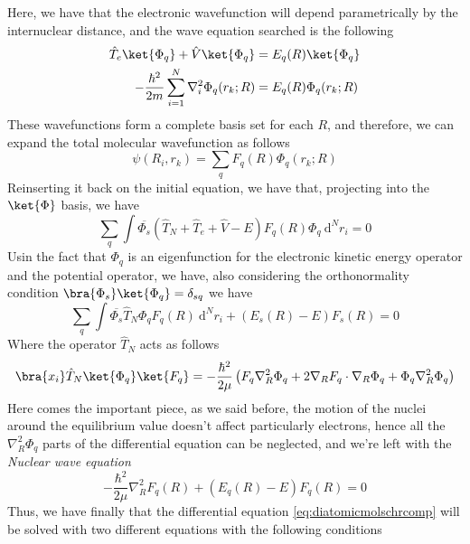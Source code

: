 \documentclass[a4paper, 11pt]{book}
\newcommand{\1}{\opr{\mathds{1}}}
\newcommand{\diff}[2][]{\ \mathrm{d}^{#1}#2}
\newcommand{\opr}[1]{\hat{#1}}
\newcommand{\cc}[1]{\overline{#1}}
\theoremstyle{plain}
\begin{document}
	Here, we have that the electronic wavefunction will depend parametrically by the internuclear distance, and the wave equation searched is the following
	\begin{equation}
		\begin{aligned}
			\opr{T}_e\ket{\Phi_q}+\opr{V}\ket{\Phi_q}&=E_q(R)\ket{\Phi_q}\\
			-\frac{\hbar^2}{2m}\sum_{i=1}^N\nabla^2_i\Phi_q(r_k;R)&=E_q(R)\Phi_q(r_k;R)
		\end{aligned}
		\label{eq:electronicequationdiamol}
	\end{equation}
	These wavefunctions form a complete basis set for each $R$, and therefore, we can expand the total molecular wavefunction as follows
	\begin{equation}
		\psi(R_i,r_k)=\sum_qF_q(R)\Phi_q(r_k;R)
		\label{eq:psiexpansion}
	\end{equation}
	Reinserting it back on the initial equation, we have that, projecting into the $\ket{\Phi}$ basis, we have
	\begin{equation}
		\sum_q\int\cc{\Phi_s}\left( \opr{T}_N+\opr{T}_e+\opr{V}-E \right)F_q(R)\Phi_q\diff[N]{r_i}=0
		\label{eq:phiprojectionbornopp}
	\end{equation}
	Usin the fact that $\Phi_q$ is an eigenfunction for the electronic kinetic energy operator and the potential operator, we have, also considering the orthonormality condition $\bra{\Phi_s}\ket{\Phi_q}=\delta_{sq}$ we have
	\begin{equation}
		\sum_q\int\cc{\Phi_s}\opr{T}_N\Phi_qF_q(R)\diff[N]r_i+\left( E_s(R)-E \right)F_s(R)=0
		\label{eq:substitutionbornopp}
	\end{equation}
	Where the operator $\opr{T}_N$ acts as follows
	\begin{equation}
		\bra{x_i}\opr{T}_N\ket{\Phi_q}\ket{F_q}=-\frac{\hbar^2}{2\mu}\left( F_q\nabla_R^2\Phi_q+2\nabla_RF_q\cdot\nabla_R\Phi_q+\Phi_q\nabla^2_R\Phi_q \right)
		\label{eq:bornoppenheimerapprox}
	\end{equation}
	Here comes the important piece, as we said before, the motion of the nuclei around the equilibrium value doesn't affect particularly electrons, hence all the $\nabla_R^2\Phi_q$ parts of the differential equation can be neglected, and we're left with the \textit{Nuclear wave equation}
	\begin{equation}
		-\frac{\hbar^2}{2\mu}\nabla_R^2F_q(R)+(E_q(R)-E)F_q(R)=0
		\label{eq:nuclearwaveequationbornopp}
	\end{equation}
	Thus, we have finally that the differential equation \eqref{eq:diatomicmolschrcomp} will be solved with two different equations with the following conditions
\end{document}

